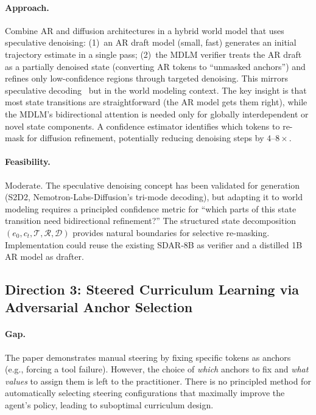 \documentclass[11pt,a4paper]{article}
\begin{document}
\paragraph{Approach.}
Combine AR and diffusion architectures in a hybrid world model that uses speculative denoising: (1)~an AR draft model (small, fast) generates an initial trajectory estimate in a single pass; (2)~the MDLM verifier treats the AR draft as a partially denoised state (converting AR tokens to ``unmasked anchors'') and refines only low-confidence regions through targeted denoising. This mirrors speculative decoding~\cite{s2d2} but in the world modeling context. The key insight is that most state transitions are straightforward (the AR model gets them right), while the MDLM's bidirectional attention is needed only for globally interdependent or novel state components. A confidence estimator identifies which tokens to re-mask for diffusion refinement, potentially reducing denoising steps by $4$--$8\times$.

\paragraph{Feasibility.}
Moderate. The speculative denoising concept has been validated for generation (S2D2, Nemotron-Labs-Diffusion's tri-mode decoding), but adapting it to world modeling requires a principled confidence metric for ``which parts of this state transition need bidirectional refinement?'' The structured state decomposition $(e_0, c_t, \mathcal{T}, \mathcal{R}, \mathcal{D})$ provides natural boundaries for selective re-masking. Implementation could reuse the existing SDAR-8B as verifier and a distilled 1B AR model as drafter.

\subsection{Direction 3: Steered Curriculum Learning via Adversarial Anchor Selection}

\paragraph{Gap.}
The paper demonstrates manual steering by fixing specific tokens as anchors (e.g., forcing a tool failure). However, the choice of \emph{which} anchors to fix and \emph{what values} to assign them is left to the practitioner. There is no principled method for automatically selecting steering configurations that maximally improve the agent's policy, leading to suboptimal curriculum design.
\end{document}
